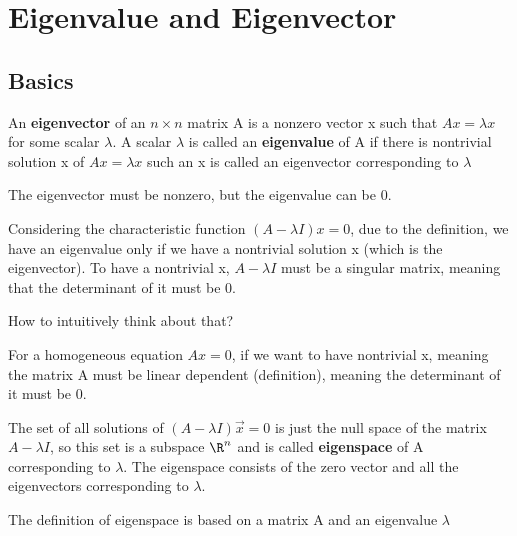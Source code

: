 \chapter{Eigenvalue and Eigenvector}

\section{Basics}

\begin{definition}
    An \textbf{eigenvector}  of an \(n \times  n\)  matrix A is a nonzero vector x such that \(Ax = \lambda x\) for some scalar \(\lambda \). 
    A scalar \(\lambda \) is called an \textbf{eigenvalue}  of A if there is nontrivial solution x of \(Ax = \lambda x\) such an x is called an eigenvector corresponding to \(\lambda \)       
\end{definition}

\begin{remark}
    The eigenvector must be nonzero, but the eigenvalue can be 0.
\end{remark}

Considering the characteristic function \((A - \lambda I)x = 0\), due to the definition, we have an eigenvalue only if we have a nontrivial solution x (which is the eigenvector). To have a nontrivial x, \(A - \lambda I\)  must be a singular matrix, meaning that the determinant of it must be 0.

\begin{remark}
    How to intuitively think about that?

    For a homogeneous equation \(Ax = 0\), if we want to have nontrivial x, meaning the matrix A must be linear dependent (definition), meaning the determinant of it must be 0.  
\end{remark}

\begin{definition}
    The set of all solutions of \((A -\lambda I)\vec{x}  = 0\) is just the null space of the matrix \(A - \lambda I\), so this set is a subspace \(\R^n\)  and is called \textbf{eigenspace} of A corresponding to \(\lambda\).  
    The eigenspace consists of the zero vector and all the eigenvectors corresponding to \(\lambda\). 
\end{definition}

\begin{remark}
    The definition of eigenspace is based on a matrix A and an eigenvalue \(\lambda\) 
\end{remark}


